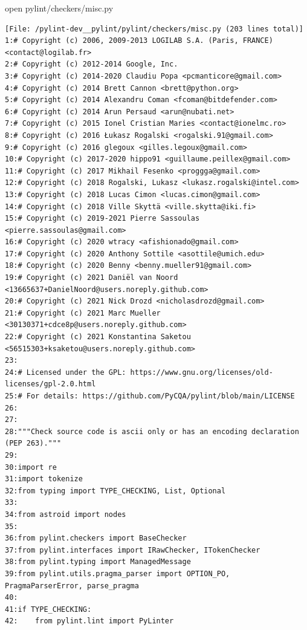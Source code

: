{\begin{agentbox}
\hrulefill
\begin{CodeVerbatim}[breaklines=true, breakanywhere=true]
open pylint/checkers/misc.py
\end{CodeVerbatim}
\end{agentbox}
\begin{observationbox}\begin{Verbatim}[breaklines=true, breakanywhere=true]
[File: /pylint-dev__pylint/pylint/checkers/misc.py (203 lines total)]
1:# Copyright (c) 2006, 2009-2013 LOGILAB S.A. (Paris, FRANCE) <contact@logilab.fr>
2:# Copyright (c) 2012-2014 Google, Inc.
3:# Copyright (c) 2014-2020 Claudiu Popa <pcmanticore@gmail.com>
4:# Copyright (c) 2014 Brett Cannon <brett@python.org>
5:# Copyright (c) 2014 Alexandru Coman <fcoman@bitdefender.com>
6:# Copyright (c) 2014 Arun Persaud <arun@nubati.net>
7:# Copyright (c) 2015 Ionel Cristian Maries <contact@ionelmc.ro>
8:# Copyright (c) 2016 Łukasz Rogalski <rogalski.91@gmail.com>
9:# Copyright (c) 2016 glegoux <gilles.legoux@gmail.com>
10:# Copyright (c) 2017-2020 hippo91 <guillaume.peillex@gmail.com>
11:# Copyright (c) 2017 Mikhail Fesenko <proggga@gmail.com>
12:# Copyright (c) 2018 Rogalski, Lukasz <lukasz.rogalski@intel.com>
13:# Copyright (c) 2018 Lucas Cimon <lucas.cimon@gmail.com>
14:# Copyright (c) 2018 Ville Skyttä <ville.skytta@iki.fi>
15:# Copyright (c) 2019-2021 Pierre Sassoulas <pierre.sassoulas@gmail.com>
16:# Copyright (c) 2020 wtracy <afishionado@gmail.com>
17:# Copyright (c) 2020 Anthony Sottile <asottile@umich.edu>
18:# Copyright (c) 2020 Benny <benny.mueller91@gmail.com>
19:# Copyright (c) 2021 Daniël van Noord <13665637+DanielNoord@users.noreply.github.com>
20:# Copyright (c) 2021 Nick Drozd <nicholasdrozd@gmail.com>
21:# Copyright (c) 2021 Marc Mueller <30130371+cdce8p@users.noreply.github.com>
22:# Copyright (c) 2021 Konstantina Saketou <56515303+ksaketou@users.noreply.github.com>
23:
24:# Licensed under the GPL: https://www.gnu.org/licenses/old-licenses/gpl-2.0.html
25:# For details: https://github.com/PyCQA/pylint/blob/main/LICENSE
26:
27:
28:"""Check source code is ascii only or has an encoding declaration (PEP 263)."""
29:
30:import re
31:import tokenize
32:from typing import TYPE_CHECKING, List, Optional
33:
34:from astroid import nodes
35:
36:from pylint.checkers import BaseChecker
37:from pylint.interfaces import IRawChecker, ITokenChecker
38:from pylint.typing import ManagedMessage
39:from pylint.utils.pragma_parser import OPTION_PO, PragmaParserError, parse_pragma
40:
41:if TYPE_CHECKING:
42:    from pylint.lint import PyLinter

\end{Verbatim}
\end{observationbox}}
